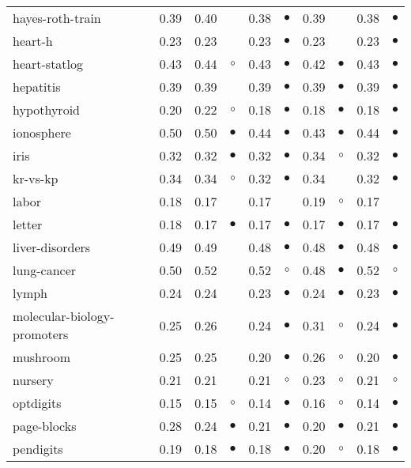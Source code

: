 {\begin{longtable}{lrr@{\hspace{0.1cm}}cr@{\hspace{0.1cm}}cr@{\hspace{0.1cm}}cr@{\hspace{0.1cm}}c}
hayes-roth-train & 0.39 & 0.40 &            & 0.38 & $\bullet$ & 0.39 &            & 0.38 & $\bullet$\\
heart-h & 0.23 & 0.23 &            & 0.23 & $\bullet$ & 0.23 &            & 0.23 & $\bullet$\\
heart-statlog & 0.43 & 0.44 &    $\circ$ & 0.43 & $\bullet$ & 0.42 &  $\bullet$ & 0.43 & $\bullet$\\
hepatitis & 0.39 & 0.39 &            & 0.39 & $\bullet$ & 0.39 &  $\bullet$ & 0.39 & $\bullet$\\
hypothyroid & 0.20 & 0.22 &    $\circ$ & 0.18 & $\bullet$ & 0.18 &  $\bullet$ & 0.18 & $\bullet$\\
ionosphere & 0.50 & 0.50 &  $\bullet$ & 0.44 & $\bullet$ & 0.43 &  $\bullet$ & 0.44 & $\bullet$\\
iris & 0.32 & 0.32 &  $\bullet$ & 0.32 & $\bullet$ & 0.34 &    $\circ$ & 0.32 & $\bullet$\\
kr-vs-kp & 0.34 & 0.34 &    $\circ$ & 0.32 & $\bullet$ & 0.34 &            & 0.32 & $\bullet$\\
labor & 0.18 & 0.17 &            & 0.17 &           & 0.19 &    $\circ$ & 0.17 &          \\
letter & 0.18 & 0.17 &  $\bullet$ & 0.17 & $\bullet$ & 0.17 &  $\bullet$ & 0.17 & $\bullet$\\
liver-disorders & 0.49 & 0.49 &            & 0.48 & $\bullet$ & 0.48 &  $\bullet$ & 0.48 & $\bullet$\\
lung-cancer & 0.50 & 0.52 &            & 0.52 &   $\circ$ & 0.48 &  $\bullet$ & 0.52 &   $\circ$\\
lymph & 0.24 & 0.24 &            & 0.23 & $\bullet$ & 0.24 &  $\bullet$ & 0.23 & $\bullet$\\
molecular-biology-promoters & 0.25 & 0.26 &            & 0.24 & $\bullet$ & 0.31 &    $\circ$ & 0.24 & $\bullet$\\
mushroom & 0.25 & 0.25 &            & 0.20 & $\bullet$ & 0.26 &    $\circ$ & 0.20 & $\bullet$\\
nursery & 0.21 & 0.21 &            & 0.21 &   $\circ$ & 0.23 &    $\circ$ & 0.21 &   $\circ$\\
optdigits & 0.15 & 0.15 &    $\circ$ & 0.14 & $\bullet$ & 0.16 &    $\circ$ & 0.14 & $\bullet$\\
page-blocks & 0.28 & 0.24 &  $\bullet$ & 0.21 & $\bullet$ & 0.20 &  $\bullet$ & 0.21 & $\bullet$\\
pendigits & 0.19 & 0.18 &  $\bullet$ & 0.18 & $\bullet$ & 0.20 &    $\circ$ & 0.18 & $\bullet$\\

\end{longtable}}
